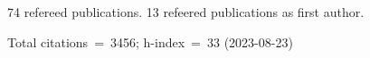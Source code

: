 74 refereed publications. 13 refeered publications as first author.

Total citations~=~3456; h-index~=~33 (2023-08-23)